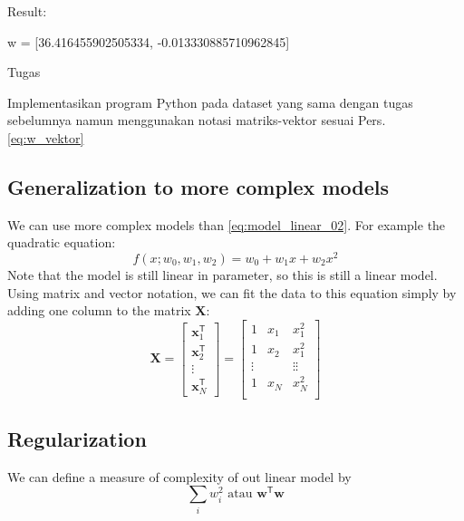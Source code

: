 \documentclass[a4paper,11pt]{article} %
\begin{document}
Result:
\begin{textcode}
w = [36.416455902505334, -0.013330885710962845]
\end{textcode}

Tugas

Implementasikan program Python pada dataset yang sama dengan tugas sebelumnya
namun menggunakan notasi matriks-vektor sesuai Pers. \ref{eq:w_vektor}

\subsection{Generalization to more complex models}

We can use more complex models than \eqref{eq:model_linear_02}. For example
the quadratic equation:
\begin{equation}
f(x; w_{0}, w_{1}, w_{2}) = w_{0} +w_{1}x + w_{2}x^{2}
\label{eq:quadratic_eq}
\end{equation}
Note that the model is still linear in parameter, so this is still a linear model.
Using matrix and vector notation, we can fit the data to this equation simply by
adding one column to the matrix $\mathbf{X}$:
\begin{equation}
\mathbf{X} = \begin{bmatrix}
\mathbf{x}^{\mathsf{T}}_{1} \\
\mathbf{x}^{\mathsf{T}}_{2} \\
\vdots \\
\mathbf{x}^{\mathsf{T}}_{N}
\end{bmatrix} =
\begin{bmatrix}
1 & x_{1} & x_{1}^{2} \\
1 & x_{2} & x_{1}^{2} \\
\vdots & & \vdots \vdots \\
1 & x_{N} & x_{N}^{2} \\
\end{bmatrix}
\end{equation}


\subsection{Regularization}

We can define a measure of complexity of out linear model by
\begin{equation}
\sum_{i} w_{i}^{2}\,\,\text{atau }\mathbf{w}^{\mathsf{T}}\mathbf{w}
\end{equation}
\end{document}
